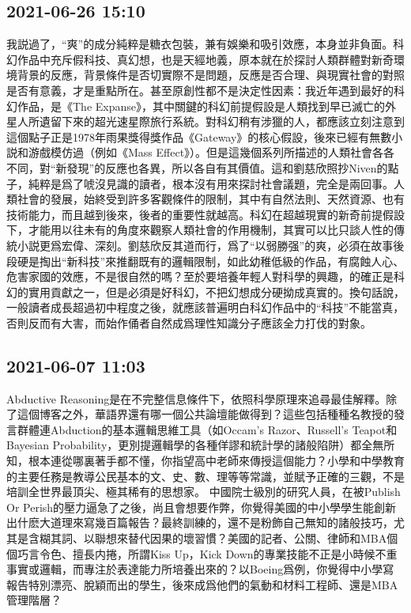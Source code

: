 \documentclass[twocolumn]{ctexart}
\begin{document}
\subsection*{2021-06-26 15:10}
我説過了，“爽”的成分純粹是糖衣包裝，兼有娛樂和吸引效應，本身並非負面。科幻作品中充斥假科技、真幻想，也是天經地義，原本就在於探討人類群體對新奇環境背景的反應，背景條件是否切實際不是問題，反應是否合理、與現實社會的對照是否有意義，才是重點所在。甚至原創性都不是決定性因素：我近年遇到最好的科幻作品，是《The Expanse》，其中關鍵的科幻前提假設是人類找到早已滅亡的外星人所遺留下來的超光速星際旅行系統。對科幻稍有涉獵的人，都應該立刻注意到這個點子正是1978年雨果獎得獎作品《Gateway》的核心假設，後來已經有無數小説和游戲模仿過（例如《Mass Effect》）。但是這幾個系列所描述的人類社會各各不同，對“新發現”的反應也各異，所以各自有其價值。這和劉慈欣照抄Niven的點子，純粹是爲了唬沒見識的讀者，根本沒有用來探討社會議題，完全是兩回事。人類社會的發展，始終受到許多客觀條件的限制，其中有自然法則、天然資源、也有技術能力，而且越到後來，後者的重要性就越高。科幻在超越現實的新奇前提假設下，才能用以往未有的角度來觀察人類社會的作用機制，其實可以比只談人性的傳統小説更爲宏偉、深刻。劉慈欣反其道而行，爲了“以弱勝强”的爽，必須在故事後段硬是掏出“新科技”來推翻既有的邏輯限制，如此幼稚低級的作品，有腐蝕人心、危害家國的效應，不是很自然的嗎？至於要培養年輕人對科學的興趣，的確正是科幻的實用貢獻之一，但是必須是好科幻，不把幻想成分硬拗成真實的。換句話說，一般讀者成長超過初中程度之後，就應該普遍明白科幻作品中的“科技”不能當真，否則反而有大害，而始作俑者自然成爲理性知識分子應該全力打伐的對象。\subsection*{2021-06-07 11:03}

Abductive Reasoning是在不完整信息條件下，依照科學原理來追尋最佳解釋。除了這個博客之外，華語界還有哪一個公共論壇能做得到？這些包括種種名教授的發言群體連Abduction的基本邏輯思維工具（如Occam's Razor、Russell's Teapot和Bayesian Probability，更別提邏輯學的各種佯謬和統計學的諸般陷阱）都全無所知，根本連從哪裏著手都不懂，你指望高中老師來傳授這個能力？小學和中學教育的主要任務是教導公民基本的文、史、數、理等等常識，並賦予正確的三觀，不是培訓全世界最頂尖、極其稀有的思想家。
中國院士級別的研究人員，在被Publish Or Perish的壓力逼急了之後，尚且會想要作弊，你覺得美國的中小學學生能創新出什麽大道理來寫幾百篇報告？最終訓練的，還不是粉飾自己無知的諸般技巧，尤其是含糊其詞、以聯想來替代因果的壞習慣？美國的記者、公關、律師和MBA個個巧言令色、擅長内捲，所謂Kiss Up，Kick Down的專業技能不正是小時候不重事實或邏輯，而專注於表達能力所培養出來的？以Boeing爲例，你覺得中小學寫報告特別漂亮、脫穎而出的學生，後來成爲他們的氣動和材料工程師、還是MBA管理階層？
\end{document}
